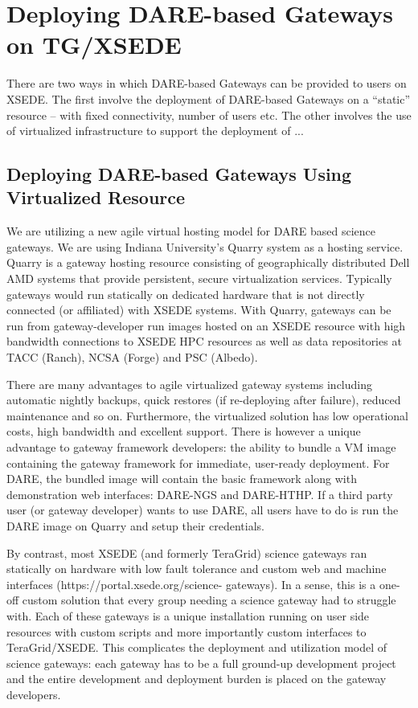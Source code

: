 \documentclass[]{svjour3}
\begin{document}
%

\section{Deploying DARE-based Gateways on TG/XSEDE}

There are two ways in which DARE-based Gateways can be provided to
users on XSEDE. The first involve the deployment of DARE-based
Gateways on a ``static'' resource -- with fixed connectivity, number
of users etc. The other involves the use of virtualized infrastructure
to support the deployment of ...

\subsection{Deploying DARE-based Gateways Using Virtualized Resource}
We are utilizing a new agile virtual hosting model for DARE based
science gateways. We are using Indiana University's Quarry system as a
hosting service. Quarry is a gateway hosting resource consisting of
geographically distributed Dell AMD systems that provide persistent,
secure virtualization services. Typically gateways would run
statically on dedicated hardware that is not directly connected (or
affiliated) with XSEDE systems. With Quarry, gateways can be run from
gateway-developer run images hosted on an XSEDE resource with high
bandwidth connections to XSEDE HPC resources as well as data
repositories at TACC (Ranch), NCSA (Forge) and PSC (Albedo).

There are many advantages to agile virtualized gateway systems
including automatic nightly backups, quick restores (if re-deploying
after failure), reduced maintenance and so on. Furthermore, the
virtualized solution has low operational costs, high bandwidth and
excellent support. There is however a unique advantage to gateway
framework developers: the ability to bundle a VM image containing the
gateway framework for immediate, user-ready deployment.  For DARE, the
bundled image will contain the basic framework along with
demonstration web interfaces: DARE-NGS and DARE-HTHP. If a third party
user (or gateway developer) wants to use DARE, all users have to do is
run the DARE image on Quarry and setup their credentials.

By contrast, most XSEDE (and formerly TeraGrid) science gateways ran
statically on hardware with low fault tolerance and custom web and
machine interfaces (https://portal.xsede.org/science- gateways). In a
sense, this is a one-off custom solution that every group needing a
science gateway had to struggle with. Each of these gateways is a
unique installation running on user side resources with custom scripts
and more importantly custom interfaces to TeraGrid/XSEDE.  This
complicates the deployment and utilization model of science gateways:
each gateway has to be a full ground-up development project and the
entire development and deployment burden is placed on the gateway
developers.
\end{document}
